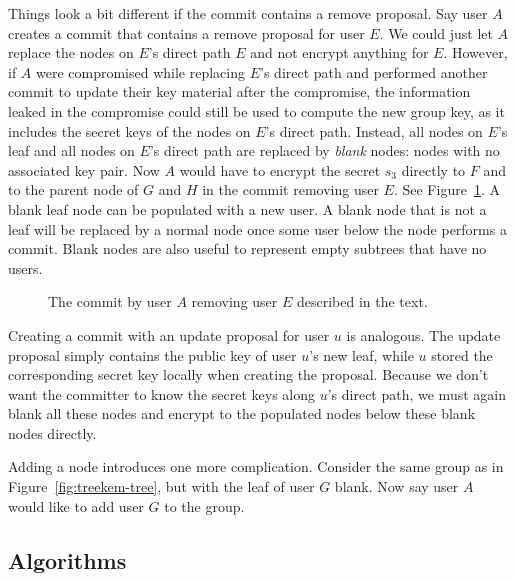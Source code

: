 Things look a bit different if the commit contains a remove proposal. Say user $A$ creates a commit that contains a remove proposal for user $E$. We could just let $A$ replace the nodes on $E$'s direct path $E$ and not encrypt anything for $E$. However, if $A$ were compromised while replacing $E$'s direct path and performed another commit to update their key material after the compromise, the information leaked in the compromise could still be used to compute the new group key, as it includes the secret keys of the nodes on $E$'s direct path.
Instead, all nodes on $E$'s leaf and all nodes on $E$'s direct path are replaced by \emph{blank} nodes: nodes with no associated key pair. Now $A$ would have to encrypt the secret $s_3$ directly to $F$ and to the parent node of $G$ and $H$ in the commit removing user $E$. See Figure~\ref{fig:treekem-remove-user}. A blank leaf node can be populated with a new user. A blank node that is not a leaf will be replaced by a normal node once some user below the node performs a commit. Blank nodes are also useful to represent empty subtrees that have no users.

\begin{figure}
	\begin{center}
	\end{center}
	\caption{The commit by user $A$ removing user $E$ described in the text.}\label{fig:treekem-remove-user}
\end{figure}

Creating a commit with an update proposal for user $u$ is analogous. The update proposal simply contains the public key of user $u$'s new leaf, while $u$ stored the corresponding secret key locally when creating the proposal. Because we don't want the committer to know the secret keys along $u$'s direct path, we must again blank all these nodes and encrypt to the populated nodes below these blank nodes directly.

Adding a node introduces one more complication. Consider the same group as in Figure~\ref{fig:treekem-tree}, but with the leaf of user $G$ blank. Now say user $A$ would like to add user $G$ to the group.



\subsection{Algorithms}

